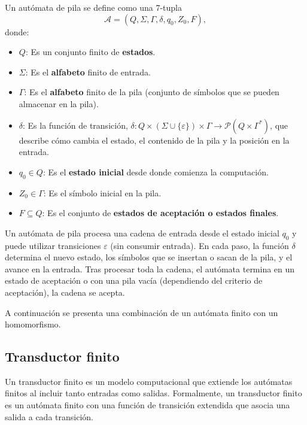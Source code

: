 \documentclass[12pt]{article}
\begin{document}
Un autómata de pila se define como una 7-tupla
\[
      \mathcal{A} = (Q, \Sigma, \Gamma, \delta, q_0, Z_0, F),
\]
donde:

\begin{itemize}
      \item $Q$: Es un conjunto finito de \textbf{estados}.
      \item $\Sigma$: Es el \textbf{alfabeto} finito de entrada.
      \item $\Gamma$: Es el \textbf{alfabeto} finito de la pila (conjunto de símbolos que se pueden almacenar en la pila).
      \item $\delta$: Es la función de transición, $\delta: Q \times (\Sigma \cup \{\varepsilon\}) \times \Gamma \to \mathcal{P}(Q \times \Gamma^*)$, que describe cómo cambia el estado, el contenido de la pila y la posición en la entrada.
      \item $q_0 \in Q$: Es el \textbf{estado inicial} desde donde comienza la computación.
      \item $Z_0 \in \Gamma$: Es el símbolo inicial en la pila.
      \item $F \subseteq Q$: Es el conjunto de \textbf{estados de aceptación o estados finales}.
\end{itemize}

Un autómata de pila procesa una cadena de entrada desde el estado inicial $q_0$ y
puede utilizar transiciones $\varepsilon$ (sin consumir entrada). En cada paso, la función $\delta$
determina el nuevo estado, los símbolos que se insertan o sacan de la pila, y el avance en la entrada.
Tras procesar toda la cadena, el autómata termina en un estado de aceptación o con una pila vacía 
(dependiendo del criterio de aceptación), la cadena se acepta.

A continuación se presenta una combinación de un autómata finito con un homomorfismo. 
\subsection{Transductor finito}

Un transductor finito \cite{geeksforgeeks_finite_state_transducer} es un modelo computacional que extiende los autómatas finitos al incluir tanto entradas como salidas.
Formalmente, un transductor finito es un autómata finito con una función de transición extendida
que asocia una salida a cada transición.
\end{document}
